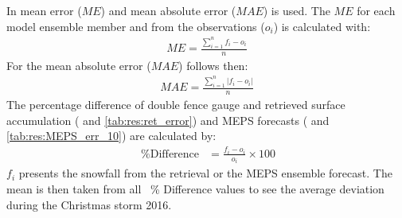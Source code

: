 In  mean error ($ME$) and mean absolute error ($MAE$) is used. The $ME$ for each model ensemble member and from the observations ($o_i$) is calculated with: 
\begin{align}
	ME = \frac{\sum_{i=1}^n f_i - o_i}{n}
\end{align}
For the mean absolute error ($MAE$) follows then:
\begin{align}
	MAE = \frac{\sum_{i=1}^n \left| f_i - o_i\right|}{n} \label{eq:MAE}
\end{align}
%
The percentage difference of double fence gauge and retrieved surface accumulation ( and \ref{tab:res:ret_error}) and MEPS forecasts ( and \ref{tab:res:MEPS_err_10}) are calculated by:
\begin{align}
	\SI{}{\percent} \text{Difference} & = \frac{f_i - o_i}{o_i} \times 100
\end{align}
$f_i$ presents the snowfall from the retrieval or the MEPS ensemble forecast. The mean is then taken from all \SI{}{\percent} Difference values to see the average deviation during the Christmas storm 2016.

